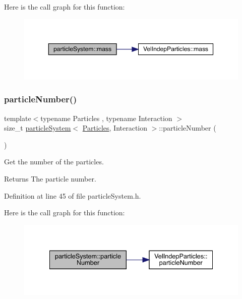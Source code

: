 Here is the call graph for this function\+:\nopagebreak
\begin{figure}[H]
\begin{center}
\leavevmode
\includegraphics[width=350pt]{classparticle_system_a1bbc12a8ac1923956f409e6f66cdc12d_cgraph}
\end{center}
\end{figure}
\mbox{\label{classparticle_system_a859f7ca9a229b8b934ba1de2607b878a}} 
\subsubsection{\texorpdfstring{particle\+Number()}{particleNumber()}}
{\footnotesize\ttfamily template$<$typename Particles , typename Interaction $>$ \\
size\+\_\+t \mbox{\hyperlink{classparticle_system}{particle\+System}}$<$ \mbox{\hyperlink{struct_particles}{Particles}}, Interaction $>$\+::particle\+Number (\begin{DoxyParamCaption}{ }\end{DoxyParamCaption})\hspace{0.3cm}{\ttfamily [inline]}}



Get the number of the particles. 

\begin{DoxyReturn}{Returns}
The particle number. 
\end{DoxyReturn}


Definition at line 45 of file particle\+System.\+h.

Here is the call graph for this function\+:\nopagebreak
\begin{figure}[H]
\begin{center}
\leavevmode
\includegraphics[width=334pt]{classparticle_system_a859f7ca9a229b8b934ba1de2607b878a_cgraph}
\end{center}
\end{figure}
\mbox{\label{classparticle_system_a7a4b29e872ff56670d6ad553df57b22b}} 
